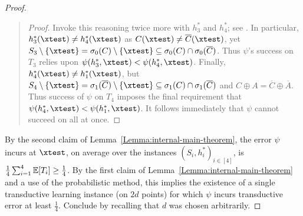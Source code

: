 \begin{proof}
\begin{quote}
\begin{proof}
Invoke this reasoning twice more with $h^*_3$ and $h^*_4$; see . In particular, $h^*_3(\xtest) \neq h^*_4(\xtest)$ as $C(\xtest) \neq \overline{C}(\xtest)$, yet $S_3 \setminus \{\xtest\} = \sigma_0(C) \setminus \{\xtest\} \subseteq \sigma_0(C) \cap \sigma_0(\overline{C})$. Thus $\psi$'s success on $T_3$ relies upon $\psi(h^*_3, \xtest) < \psi(h^*_4, \xtest)$. Finally, $h^*_4(\xtest) \neq h^*_1(\xtest)$, but $S_4 \setminus \{\xtest\} = \sigma_1(\overline{C}) \setminus \{\xtest\} \subseteq \sigma_1(C) \cap \sigma_1(\overline{C})$ and $C \oplus A = \overline{C} \oplus \overline{A}$. Thus success of $\psi$ on $T_4$ imposes the final requirement that $\psi(h^*_4, \xtest) < \psi(h^*_1, \xtest)$. It follows immediately that $\psi$ cannot succeed on all at once. 
\end{proof}
\end{quote}

By the second claim of Lemma~\ref{Lemma:internal-main-theorem}, the error $\psi$ incurs at $\xtest$, on average over the instances $(S_i, h^*_i)_{i \in [4]}$, is $\frac{1}{4}\sum_{i=1}^4 \operatorname*{\mathbb{E}} [T_i] \geq \frac{1}{4}$.  By the first claim of Lemma~\ref{Lemma:internal-main-theorem}
and a use of the probabilistic method, this implies the existence of a single transductive learning instance (on $2d$ points) for which $\psi$ incurs transductive error at least $\frac{1}{4}$. Conclude by recalling that $d$ was chosen arbitrarily. 
\end{proof}
